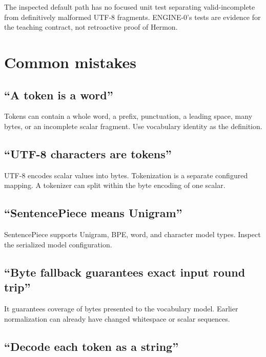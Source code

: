 The inspected default path has no focused unit test separating
valid-incomplete from definitively malformed UTF-8 fragments. ENGINE-0's
tests are evidence for the teaching contract, not retroactive proof of
Hermon.

\section{Common mistakes}\label{common-mistakes-1}

\subsection{``A token is a word''}\label{a-token-is-a-word}

Tokens can contain a whole word, a prefix, punctuation, a leading space,
many bytes, or an incomplete scalar fragment. Use vocabulary identity as
the definition.

\subsection{``UTF-8 characters are
tokens''}\label{utf-8-characters-are-tokens}

UTF-8 encodes scalar values into bytes. Tokenization is a separate
configured mapping. A tokenizer can split within the byte encoding of
one scalar.

\subsection{``SentencePiece means
Unigram''}\label{sentencepiece-means-unigram}

SentencePiece supports Unigram, BPE, word, and character model types.
Inspect the serialized model configuration.

\subsection{``Byte fallback guarantees exact input round
trip''}\label{byte-fallback-guarantees-exact-input-round-trip}

It guarantees coverage of bytes presented to the vocabulary model.
Earlier normalization can already have changed whitespace or scalar
sequences.

\subsection{``Decode each token as a
string''}\label{decode-each-token-as-a-string}

